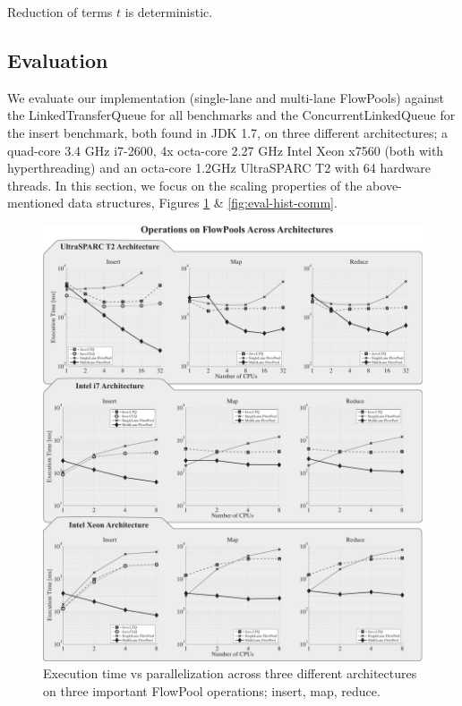 \begin{theorem}
Reduction of terms $t$ is deterministic.
\end{theorem}


\subsection{Evaluation}
\label{sec:evaluation}

We evaluate our implementation (single-lane and multi-lane FlowPools) against
the LinkedTransferQueue \cite{SchererLS09} for all benchmarks and the
ConcurrentLinkedQueue \cite{Michael96} for the insert benchmark, both found in
JDK 1.7, on three different architectures; a quad-core 3.4 GHz i7-2600, 4x
octa-core 2.27 GHz Intel Xeon x7560 (both with hyperthreading) and an octa-core
1.2GHz UltraSPARC T2 with 64 hardware threads. In this section, we focus
on the scaling properties of the above-mentioned data structures, Figures
\ref{fig:eval-cpu-scaling} \& \ref{fig:eval-hist-comm}.

\begin{figure}[!t]
\centering
\includegraphics[width=\textwidth]{images/scaling-operations}
\setlength{\abovecaptionskip}{-10pt}
\setlength{\belowcaptionskip}{-20pt}
\caption{Execution time vs parallelization across three different
architectures on three important FlowPool operations; insert, map,
reduce.}
\label{fig:eval-cpu-scaling}
\end{figure}

